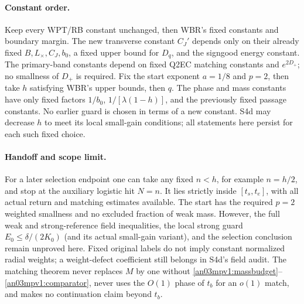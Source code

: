 \documentclass[11pt]{article}
\numberwithin{equation}{section}
\theoremstyle{remark}\newtheorem{remark}[theorem]{Remark}
\begin{document}
\paragraph{Constant order.}
Keep every WPT/RB constant unchanged, then WBR's fixed constants
and boundary margin. The new transverse constant $C_J'$ depends
only on their already fixed $B,L_\times,C_J,b_0$, a fixed upper
bound for $D_q$, and the signgood energy constant. The primary-band
constants depend on fixed Q2EC matching constants and $e^{2D_+}$;
no smallness of $D_+$ is required. Fix the start exponent $a=1/8$
and $p=2$, then take $h$ satisfying WBR's upper bounds, then $q$.
The phase and mass constants have only fixed factors $1/b_0$,
$1/[\lambda(1-h)]$, and the previously fixed passage constants.
No earlier guard is chosen in terms of a new constant. S4d may
decrease $h$ to meet its local small-gain conditions; all statements
here persist for each such fixed choice.

\paragraph{Handoff and scope limit.}
For a later selection endpoint one can take any fixed $n<h$, for
example $n=h/2$, and stop at the auxiliary logistic hit $N=n$.
It lies strictly inside $[t_s,t_e]$, with all actual return and
matching estimates available. The start has the required $p=2$
weighted smallness and no excluded fraction of weak mass. However,
the full weak and strong-reference field inequalities, the local
strong guard $E_0\le\delta/(2K_0)$ (and its actual small-gain
variant), and the selection conclusion remain unproved here.
Fixed original labels do not imply constant normalized radial
weights; a weight-defect coefficient still belongs in S4d's field
audit. The matching theorem never replaces $M$ by one without
\eqref{an03mpv1:massbudget}--\eqref{an03mpv1:comparator}, never
uses the $O(1)$ phase of $t_b$ for an $o(1)$ match, and makes no
continuation claim beyond $t_b$.
\end{document}
